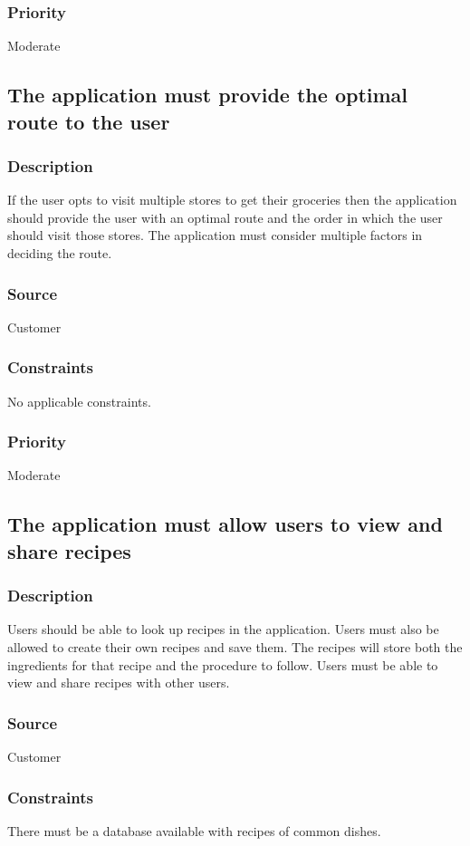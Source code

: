 \subsubsection{Priority}
Moderate\\

\subsection{The application must provide the optimal route to the user}
\subsubsection{Description}
If the user opts to visit multiple stores to get their groceries then the application should provide the user with an optimal route and the order in which the user should visit those stores. The application must consider multiple factors in deciding the route. 
\subsubsection{Source}
Customer
\subsubsection{Constraints}
No applicable constraints.
\subsubsection{Priority}
Moderate\\

\subsection{The application must allow users to view and share recipes}
\subsubsection{Description}
Users should be able to look up recipes in the application. Users must also be allowed to create their own recipes and save them. The recipes will store both the ingredients for that recipe and the procedure to follow. Users must be able to view and share recipes with other users.
\subsubsection{Source}
Customer
\subsubsection{Constraints}
There must be a database available with recipes of common dishes.
